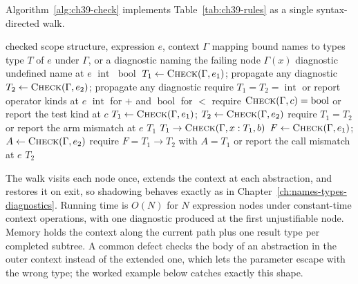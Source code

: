 Algorithm~\ref{alg:ch39-check} implements Table~\ref{tab:ch39-rules} as a single syntax-directed walk.
\begin{algorithm}
\caption{Syntax-directed checking for Mini-Fun.}
\label{alg:ch39-check}
\begin{pseudocode}
\Require checked scope structure, expression $e$, context $\Gamma$ mapping bound names to types
\Ensure type $T$ of $e$ under $\Gamma$, or a diagnostic naming the failing node
 \Return $\Gamma(x)$
\Else \Return diagnostic undefined name at $e$
\EndIf
{} \Return $\operatorname{int}$
 \Return $\operatorname{bool}$
\State $T_1 \gets \Call{Check}{\Gamma, e_1}$; propagate any diagnostic
\State $T_2 \gets \Call{Check}{\Gamma, e_2}$; propagate any diagnostic
\State require $T_1 = T_2 = \operatorname{int}$ or report operator kinds at $e$
\State \Return $\operatorname{int}$ for $+$ and $\operatorname{bool}$ for $<$
\State require $\Call{Check}{\Gamma, c} = \operatorname{bool}$ or report the test kind at $c$
\State $T_1 \gets \Call{Check}{\Gamma, e_1}$; $T_2 \gets \Call{Check}{\Gamma, e_2}$
\State require $T_1 = T_2$ or report the arm mismatch at $e$
\State \Return $T_1$
\State \Return $T_1 \to \Call{Check}{\Gamma, x : T_1, b}$
\State $F \gets \Call{Check}{\Gamma, e_1}$; $A \gets \Call{Check}{\Gamma, e_2}$
\State require $F = T_1 \to T_2$ with $A = T_1$ or report the call mismatch at $e$
\State \Return $T_2$
\EndIf
\EndFunction
\end{pseudocode}
\end{algorithm}
The walk visits each node once, extends the context at each abstraction, and restores it on exit, so shadowing behaves exactly as in Chapter~\ref{ch:names-types-diagnostics}.
Running time is $O(N)$ for $N$ expression nodes under constant-time context operations, with one diagnostic produced at the first unjustifiable node.
Memory holds the context along the current path plus one result type per completed subtree.
A common defect checks the body of an abstraction in the outer context instead of the extended one, which lets the parameter escape with the wrong type; the worked example below catches exactly this shape.

